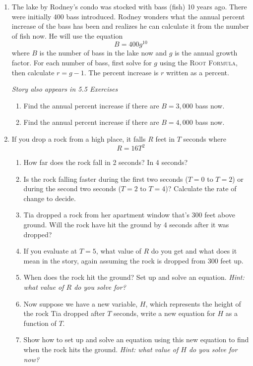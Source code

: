 \begin{enumerate}
\item The lake by Rodney's condo was stocked with bass (fish) 10 years ago.  There were initially 400 bass introduced.  Rodney wonders what the annual percent increase of the bass has been and realizes he can calculate it from the number of fish now.  He will use the equation $$B=400 g^{10}$$
where  $B$ is the number of bass in the lake now and $g$ is the annual growth factor.  For each number of bass, first solve for $g$ using the \textsc{Root Formula}, then calculate $r=g-1$.  The percent increase is $r$ written as a percent.

\hfill \emph{Story also appears in 5.5 Exercises}
\begin{enumerate}
\item Find the annual percent increase if there are $B=3,000$ bass now.
\item Find the annual percent increase if there are $B=4,000$ bass now.
\end{enumerate}

\item If you drop a rock from a high place, it falls $R$ feet in $T$ seconds where 
$$R = 16T^2$$
\begin{enumerate}
\item How far does the rock fall in 2 seconds? In 4 seconds?
\item Is the rock falling faster during the first two seconds ($T=0$ to $T=2$) or during the second two seconds ($T=2$ to $T=4$)?   Calculate the rate of change to decide.
\item Tia dropped a rock from her apartment window that's 
 300 feet above ground. Will the rock have hit the ground by 4 seconds after it was dropped?
\item If you evaluate at $T=5$, what value of $R$ do you get and what does it mean in the story, again assuming the rock is dropped from 300 feet up.
\item When does the rock hit the ground?  Set up and solve an equation.  \emph{Hint: what value of $R$ do you solve for?}
\item Now suppose we have a new variable, $H$, which represents the height of the rock Tia dropped after $T$ seconds, write a new equation for $H$ as a function of $T$.  
\item Show how to set up and solve an equation using this new equation to find when the rock hits the ground.  \emph{Hint:  what value of $H$ do you solve for now?}
\end{enumerate}


\end{enumerate}

